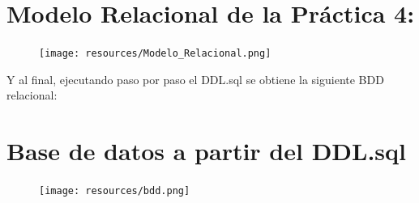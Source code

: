 \section{Modelo Relacional de la Práctica 4:}
\begin{figure}[H]
    \centering
    \texttt{[image: resources/Modelo\_Relacional.png]}
\end{figure}


Y al final, ejecutando paso por paso el DDL.sql se obtiene la siguiente BDD relacional:
\section{Base de datos a partir del DDL.sql}
\begin{figure}[H]
    \centering
    \texttt{[image: resources/bdd.png]}
\end{figure}